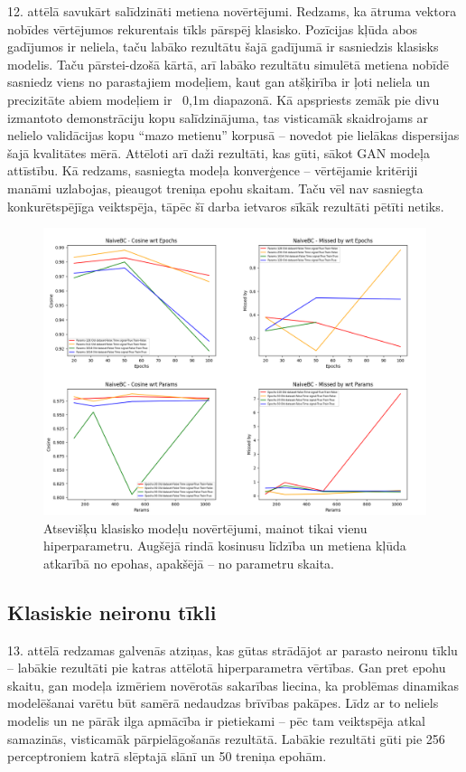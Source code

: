 \documentclass[12pt, a4paper]{article}
\numberwithin{equation}{section} %
\begin{document}
12. attēlā savukārt salīdzināti metiena novērtējumi. Redzams, ka ātruma vektora nobīdes vērtējumos rekurentais tīkls pārspēj klasisko. Pozīcijas kļūda abos gadījumos ir neliela, taču labāko rezultātu šajā gadījumā ir sasniedzis klasisks modelis. Taču pārstei-dzošā kārtā, arī labāko rezultātu simulētā metiena nobīdē sasniedz viens no parastajiem modeļiem, kaut gan atšķirība ir ļoti neliela un precizitāte abiem modeļiem ir ~0,1m diapazonā. Kā apspriests zemāk pie divu izmantoto demonstrāciju kopu salīdzinājuma, tas visticamāk skaidrojams ar nelielo validācijas kopu ``mazo metienu'' korpusā -- novedot pie lielākas dispersijas šajā kvalitātes mērā. Attēloti arī daži rezultāti, kas gūti, sākot GAN modeļa attīstību. Kā redzams, sasniegta modeļa konverģence -- vērtējamie kritēriji manāmi uzlabojas, pieaugot treniņa epohu skaitam. Taču vēl nav sasniegta konkurētspējīga veiktspēja, tāpēc šī darba ietvaros sīkāk rezultāti pētīti netiks. 

\begin{figure}[t!]
    \centering
    \includegraphics[width=16cm,page=1]{../img/naivebc-independent-params-epoch.png}
    \caption{Atsevišķu klasisko modeļu novērtējumi, mainot tikai vienu hiperparametru. Augšējā rindā kosinusu līdzība un metiena kļūda atkarībā no epohas, apakšējā -- no parametru skaita.}
\end{figure}

\subsection{Klasiskie neironu tīkli}


13. attēlā redzamas galvenās atziņas, kas gūtas strādājot ar parasto neironu tīklu -- labākie rezultāti pie katras attēlotā hiperparametra vērtības. Gan pret epohu skaitu, gan modeļa izmēriem novērotās sakarības liecina, ka problēmas dinamikas modelēšanai varētu būt samērā nedaudzas brīvības pakāpes. Līdz ar to neliels modelis un ne pārāk ilga apmācība ir pietiekami -- pēc tam veiktspēja atkal samazinās, visticamāk pārpielāgošanās rezultātā. Labākie rezultāti gūti pie 256 perceptroniem katrā slēptajā slānī un 50 treniņa epohām. 
\end{document}
